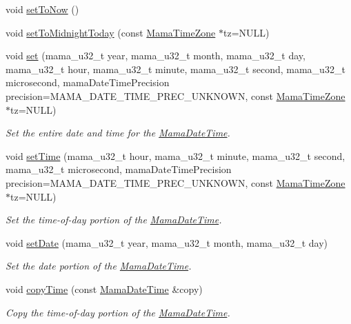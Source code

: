 \begin{DoxyCompactItemize}
void \hyperlink{classWombat_1_1MamaDateTime_a70ff9ced71b5f724cb83312f83414fef}{setToNow} ()
\item 
void \hyperlink{classWombat_1_1MamaDateTime_ad1c49cf313c23d347e458b789c24192b}{setToMidnightToday} (const \hyperlink{classWombat_1_1MamaTimeZone}{MamaTimeZone} $\ast$tz=NULL)
\item 
void \hyperlink{classWombat_1_1MamaDateTime_a0cefdc8f7306655701120a2c1bbda4ff}{set} (mama\_\-u32\_\-t year, mama\_\-u32\_\-t month, mama\_\-u32\_\-t day, mama\_\-u32\_\-t hour, mama\_\-u32\_\-t minute, mama\_\-u32\_\-t second, mama\_\-u32\_\-t microsecond, mamaDateTimePrecision precision=MAMA\_\-DATE\_\-TIME\_\-PREC\_\-UNKNOWN, const \hyperlink{classWombat_1_1MamaTimeZone}{MamaTimeZone} $\ast$tz=NULL)
\begin{DoxyCompactList}\small\item\em Set the entire date and time for the \hyperlink{classWombat_1_1MamaDateTime}{MamaDateTime}. \item\end{DoxyCompactList}\item 
void \hyperlink{classWombat_1_1MamaDateTime_ae0b8725d6dfac55b09096be914116b02}{setTime} (mama\_\-u32\_\-t hour, mama\_\-u32\_\-t minute, mama\_\-u32\_\-t second, mama\_\-u32\_\-t microsecond, mamaDateTimePrecision precision=MAMA\_\-DATE\_\-TIME\_\-PREC\_\-UNKNOWN, const \hyperlink{classWombat_1_1MamaTimeZone}{MamaTimeZone} $\ast$tz=NULL)
\begin{DoxyCompactList}\small\item\em Set the time-\/of-\/day portion of the \hyperlink{classWombat_1_1MamaDateTime}{MamaDateTime}. \item\end{DoxyCompactList}\item 
void \hyperlink{classWombat_1_1MamaDateTime_a8ea1490eef66b2103665b89070ff5b3c}{setDate} (mama\_\-u32\_\-t year, mama\_\-u32\_\-t month, mama\_\-u32\_\-t day)
\begin{DoxyCompactList}\small\item\em Set the date portion of the \hyperlink{classWombat_1_1MamaDateTime}{MamaDateTime}. \item\end{DoxyCompactList}\item 
void \hyperlink{classWombat_1_1MamaDateTime_a13ff83485883c08ce1f7a3081f3a2ad5}{copyTime} (const \hyperlink{classWombat_1_1MamaDateTime}{MamaDateTime} \&copy)
\begin{DoxyCompactList}\small\item\em Copy the time-\/of-\/day portion of the \hyperlink{classWombat_1_1MamaDateTime}{MamaDateTime}. \item\end{DoxyCompactList}\item 

\end{DoxyCompactItemize}
